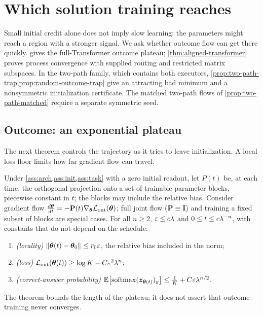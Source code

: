 \section{Which solution training reaches}
\label{sec:reach}

Small initial credit alone does not imply slow learning: the parameters might reach a region with a stronger signal. We ask
whether outcome flow can get there quickly.  gives the full-Transformer
outcome plateau; \cref{thm:aligned-transformer} proves process convergence with supplied routing
and restricted matrix subspaces. In the two-path family, which contains both executors,
\cref{prop:two-path-trap,prop:random-outcome-trap} give an attracting bad minimum and a
nonsymmetric initialization certificate. The matched two-path flows of
\cref{prop:two-path-matched} require a separate symmetric seed.

\subsection{Outcome: an exponential plateau}

The next theorem controls the trajectory as it tries to leave initialization. A local loss floor limits how far gradient flow can travel.

\begin{theorem}
\label{thm:outcome-end}
Under \cref{ass:arch,ass:init,ass:task} with a zero initial readout, let $P(t)$ be, at each time, the orthogonal projection onto a set
of trainable parameter blocks, piecewise constant in $t$; the blocks may include the relative bias. Consider gradient flow
$\tfrac{d\bm\theta}{dt}=-\mathbf P(t)\nabla_{\bm\theta}\Lout(\bm\theta)$; full joint flow ($\mathbf P\equiv\mathbf I$) and training a fixed subset of blocks are special cases.
For all $n\ge2$, $\varepsilon\le c\lambda$ and $0\le t\le c\lambda^{-n}$, with constants that do not depend on the schedule:
\begin{enumerate}[label=(\roman*),leftmargin=*,itemsep=0pt,topsep=2pt]
\item \emph{(locality)} $\|\bm\theta(t)-\bm\theta_0\|\le r_0\varepsilon$, the relative bias included in the norm;
\item \emph{(loss)} $\mathcal L_{\mathrm{out}}(\bm\theta(t))\ge\log K-C\varepsilon^2\lambda^n$;
\item \emph{(correct-answer probability)} $\mathbb E\bigl[\operatorname{softmax}(\bm z_{\bm\theta(t)})_y\bigr]\le\frac{1}{K}+C\varepsilon\lambda^{n/2}$.
\end{enumerate}
\end{theorem}
The theorem bounds the length of the plateau; it does not assert that outcome training never converges.

